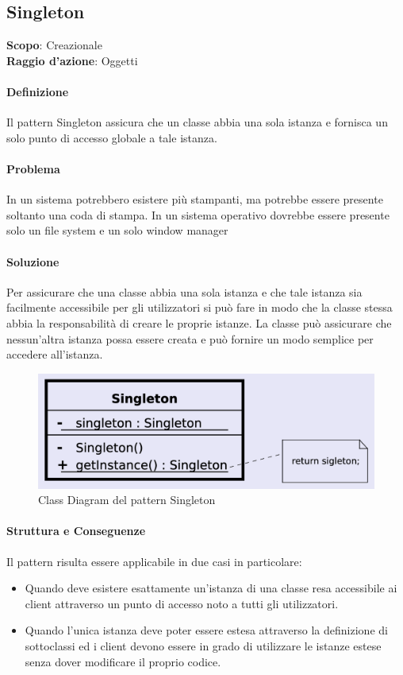\subsection{Singleton}
\label{singleton}

\textbf{Scopo}: Creazionale \\
\textbf{Raggio d'azione}: Oggetti

\paragraph{Definizione} Il pattern Singleton assicura che un classe abbia una sola istanza e fornisca un solo punto di accesso globale a tale istanza.

\paragraph{Problema} In un sistema potrebbero esistere più stampanti, ma potrebbe essere presente soltanto una coda di stampa. In un sistema operativo dovrebbe essere presente solo un file system e un solo window manager

\paragraph{Soluzione} Per assicurare che una classe abbia una sola istanza e che tale istanza sia facilmente accessibile per gli utilizzatori si può fare in modo che la classe stessa abbia la responsabilità di creare le proprie istanze. La classe può assicurare che nessun’altra istanza possa essere creata e può fornire un modo semplice per accedere all’istanza.

\begin{figure}[H]
    \centering
    \includegraphics[width=0.4\linewidth]{assets/pattern/singleton/singleton-struttura.png}
    \caption{Class Diagram del pattern Singleton}
\end{figure}

\paragraph{Struttura e Conseguenze} Il pattern risulta essere applicabile in due casi in particolare:
\begin{itemize}
    \item Quando deve esistere esattamente un’istanza di una classe resa accessibile ai client attraverso un punto di accesso noto a tutti gli utilizzatori.
    \item Quando l’unica istanza deve poter essere estesa attraverso la definizione di sottoclassi ed i client devono essere in grado di utilizzare le istanze estese senza dover modificare il proprio codice.
\end{itemize}

